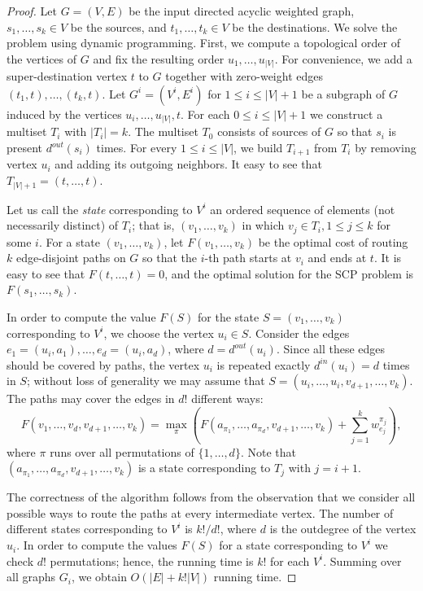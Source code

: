 \documentclass{llncs}
\newcommand{\SCoP}{\textsc{SCP}}
\begin{document}
\begin{proof}
Let $G=(V,E)$ be the input directed acyclic weighted graph,
$s_1,\dots,s_k \in V$ be the sources, and $t_1,\dots,t_k \in V$ be the
destinations.
We solve the problem using dynamic programming.
First, we compute a topological order of the vertices of $G$ and
fix the resulting order $u_1,\dots,u_{|V|}$. For convenience, we add
a super-destination vertex $t$ to $G$ together with zero-weight edges
$(t_1,t), \dots, (t_k,t)$.
Let $G^i=(V^i,E^i)$ for $1 \le i \le |V|+1$ be a subgraph of $G$ induced
by the vertices $u_i,\dots,u_{|V|},t$. For each $0\le i \le |V|+1$ we construct
a multiset $T_i$ with $|T_i|=k$. The multiset
$T_0$ consists of sources of $G$ so that $s_i$ is present $d^{out}(s_i)$ times.
For every $1\le i \le |V|$, we build $T_{i+1}$ from $T_i$ by removing vertex
$u_i$ and adding its outgoing neighbors. It easy to see that $T_{|V|+1}=(t,\dots,t)$.



Let us call the \emph{state} corresponding to $V^i$ an ordered sequence of
elements (not necessarily distinct) of $T_i$;
that is, $(v_1,\dots,v_k)$ in
which $v_j\in T_i, 1\le j\le k$ for some $i$.
For a state $(v_1,\dots,v_k)$, let $F(v_1,\dots,v_k)$ be the optimal
cost of routing $k$ edge-disjoint paths on $G$ so that the $i$-th path
starts at $v_i$ and ends at $t$.
It is easy to see that $F(t,\dots,t)=0$, and the optimal solution for the
\SCoP{} problem is $F(s_1,\dots,s_k)$.



In order to compute the value $F(S)$ for the state
$S=(v_1,\dots,v_k)$ corresponding to $V^i$, we choose the vertex $u_i\in S$.
Consider the edges $e_1=(u_i,a_1),\dots,e_d=(u_i,a_d)$, where $d=d^{out}(u_i)$.
Since all these edges should be covered by paths, the vertex $u_i$ is
repeated  exactly $d^{in}(u_i)=d$ times  in $S$;
without loss of generality we may assume that $S=(u_i,\dots,u_i,v_{d+1},\dots,v_k)$.
The paths may cover the edges in $d!$ different ways:
$$
F(v_1,\dots,v_d,v_{d+1},\dots,v_k) = \max_{\pi} \left( F(a_{\pi_1},
\dots, a_{\pi_d}, v_{d+1}, \dots, v_k) +
\sum_{j=1}^k w^{\pi_j}_{e_j} \right),
$$
where $\pi$ runs over all permutations of $\{1,\dots,d\}$. Note that
$(a_{\pi_1}, \dots, a_{\pi_d}, v_{d+1}, \dots, v_k)$ is a state
corresponding to $T_j$ with $j=i+1$.



The correctness of the algorithm follows from the observation that  we
consider all possible ways to route the paths at every intermediate
vertex.
The number of different states corresponding to $V^i$ is $k!/d!$, where $d$ is
the outdegree of the vertex $u_i$. In order to compute the values $F(S)$
for a state corresponding to $V^i$ we
check $d!$ permutations; hence, the running time is $k!$ for each
$V^i$. Summing over all graphs $G_i$, we obtain $O(|E|+k!|V|)$ running time.

\end{proof}
\end{document}
